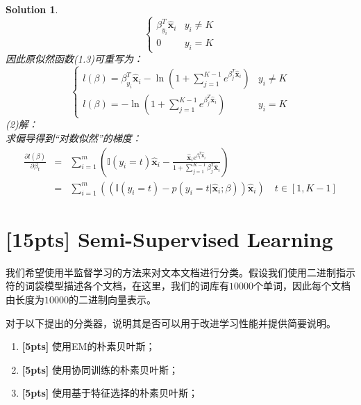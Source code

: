 \documentclass[a4paper,UTF8]{article}
\numberwithin{equation}{section}
\newtheorem*{solution}{Solution}
\begin{document}
\begin{solution}
\begin{equation*}
    \begin{cases}
        \beta^T_{y_i}\hat{\mathbf{x}}_i & y_i \neq K\\
        0 & y_i = K
    \end{cases}
\end{equation*}
因此原似然函数(1.3)可重写为：
\begin{equation*}
    \begin{cases}
        l(\beta) = \beta^T_{y_i}\hat{\mathbf{x}}_i - \ln(1+\sum^{K-1}_{j=1}e^{\beta^T_j\hat{\mathbf{x}}_i}) & y_i \neq K\\
        l(\beta) = - \ln(1+\sum^{K-1}_{j=1}e^{\beta^T_j\hat{\mathbf{x}}_i}) & y_i = K
    \end{cases}
\end{equation*}
(2)解：\\
求偏导得到“对数似然”的梯度：
\begin{eqnarray*}
	\frac{\partial l(\beta)}{\partial \beta_t}&=&\sum^m_{i=1}(\mathbb{I}(y_i=t)\hat{\mathbf{x}}_i-\frac{\hat{\mathbf{x}}_i e^{\beta^T_{t}\hat{\mathbf{x}}_i}}{1+\sum^{K-1}_{j=1}\beta^T_j\hat{\mathbf{x}}_i})\\
	&=&\sum^m_{i=1}((\mathbb{I}(y_i=t)-p(y_i=t|\hat{\mathbf{x}}_i;\beta))\hat{\mathbf{x}}_i)\quad t \in [1,K-1]
\end{eqnarray*}

\end{solution}
\newpage

\section{[15pts] Semi-Supervised Learning}
我们希望使用半监督学习的方法来对文本文档进行分类。假设我们使用二进制指示符的词袋模型描述各个文档，在这里，我们的词库有$10000$个单词，因此每个文档由长度为$10000$的二进制向量表示。

对于以下提出的分类器，说明其是否可以用于改进学习性能并提供简要说明。
\begin{enumerate}
	\item \textbf{[5pts]} 使用EM的朴素贝叶斯；
	\item \textbf{[5pts]} 使用协同训练的朴素贝叶斯；
	\item \textbf{[5pts]} 使用基于特征选择的朴素贝叶斯；
\end{enumerate}
\end{document}
